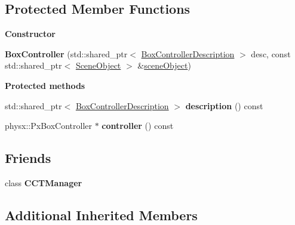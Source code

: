 \subsection*{Protected Member Functions}
\begin{Indent}\textbf{ Constructor}\par
\begin{DoxyCompactItemize}
\item 
\mbox{\label{classrev_1_1_box_controller_ab1e481d3a39f6e2a07c7d9ea3365fb14}} 
{\bfseries Box\+Controller} (std\+::shared\+\_\+ptr$<$ \mbox{\hyperlink{classrev_1_1_box_controller_description}{Box\+Controller\+Description}} $>$ desc, const std\+::shared\+\_\+ptr$<$ \mbox{\hyperlink{classrev_1_1_scene_object}{Scene\+Object}} $>$ \&\mbox{\hyperlink{classrev_1_1_character_controller_aafc51e1eb03ebd5f8f86d88b56067a64}{scene\+Object}})
\end{DoxyCompactItemize}
\end{Indent}
\begin{Indent}\textbf{ Protected methods}\par
\begin{DoxyCompactItemize}
\item 
\mbox{\label{classrev_1_1_box_controller_a8295acb0fac54cb252ebc85c9b3dd7da}} 
std\+::shared\+\_\+ptr$<$ \mbox{\hyperlink{classrev_1_1_box_controller_description}{Box\+Controller\+Description}} $>$ {\bfseries description} () const
\item 
\mbox{\label{classrev_1_1_box_controller_aefc8e2a44e894424b000565b9a4c62eb}} 
physx\+::\+Px\+Box\+Controller $\ast$ {\bfseries controller} () const
\end{DoxyCompactItemize}
\end{Indent}
\subsection*{Friends}
\begin{DoxyCompactItemize}
\item 
\mbox{\label{classrev_1_1_box_controller_aed3d0fdf6b78428902946828649415c9}} 
class {\bfseries C\+C\+T\+Manager}
\end{DoxyCompactItemize}
\subsection*{Additional Inherited Members}


